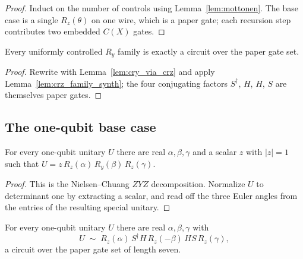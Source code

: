\begin{proof}
  \leanok
  Induct on the number of controls using Lemma~\ref{lem:mottonen}.  The base
  case is a single $R_z(\theta)$ on one wire, which is a paper gate; each
  recursion step contributes two embedded $C(X)$ gates.
\end{proof}

\begin{lemma}
  \label{lem:cry_family_synth}
  \leanok
  Every uniformly controlled $R_y$ family is exactly a circuit over the paper
  gate set.
\end{lemma}

\begin{proof}
  \leanok
  Rewrite with Lemma~\ref{lem:cry_via_crz} and apply
  Lemma~\ref{lem:crz_family_synth}; the four conjugating factors $S^\dagger$,
  $H$, $H$, $S$ are themselves paper gates.
\end{proof}

\subsection{The one-qubit base case}

\begin{lemma}
  \label{lem:oneq_euler}
  \leanok
  For every one-qubit unitary $U$ there are real $\alpha, \beta, \gamma$ and a
  scalar $z$ with $\lvert z\rvert = 1$ such that
  $U = z\,R_z(\alpha)\,R_y(\beta)\,R_z(\gamma)$.
\end{lemma}

\begin{proof}
  \leanok
  This is the Nielsen--Chuang $ZYZ$ decomposition.  Normalize $U$ to determinant
  one by extracting a scalar, and read off the three Euler angles from the
  entries of the resulting special unitary.
\end{proof}

\begin{lemma}
  \label{lem:oneq_base}
  \leanok
  For every one-qubit unitary $U$ there are real $\alpha, \beta, \gamma$ with
  \[
    U \;\sim\; R_z(\alpha)\, S^\dagger H\, R_z(-\beta)\, H S\, R_z(\gamma),
  \]
  a circuit over the paper gate set of length seven.
\end{lemma}

